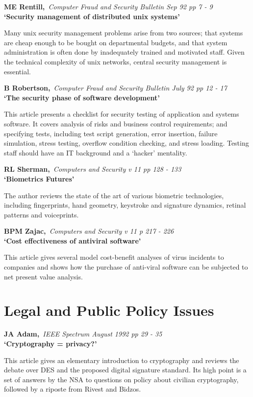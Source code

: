 {\bf \noindent ME Rentill,}{\em ~Computer Fraud and Security Bulletin Sep 92
pp 7 - 9\\}
{\bf `Security management of distributed unix systems'}

Many unix security management problems arise from two sources; that systems
are cheap enough to be bought on departmental budgets, and that system
administration is often done by inadequately trained and motivated staff.
Given the technical complexity of unix networks, central security management
is essential.

{\bf \noindent B Robertson,}{\em ~Computer Fraud and Security Bulletin July 
92 pp 12 - 17\\}
{\bf `The security phase of software development'}

This article presents a checklist for security testing of application and
systems software. It covers analysis of risks and business control 
requirements; and specifying tests, including test script generation, error
insertion, failure simulation, stress testing, overflow condition checking,
and stress loading. Testing staff should have an IT background and a
`hacker' mentality.

{\bf \noindent RL Sherman,}{\em ~Computers and Security v 11 pp 128 - 133\\}
{\bf `Biometrics Futures'}

The author reviews the state of the art of various biometric technologies,
including fingerprints, hand geometry, keystroke and signature dynamics, 
retinal patterns and voiceprints.

{\bf \noindent BPM Zajac,}{\em ~Computers and Security v 11 p 217 -  226\\}
{\bf `Cost effectiveness of antiviral software'}

This article gives several model cost-benefit analyses of virus incidents to 
companies and shows how the purchase of anti-viral software can be subjected 
to net present value analysis.



\pagebreak
\normalsize
\section{Legal and Public Policy Issues}
\small

{\bf \noindent JA Adam,}{\em ~IEEE Spectrum August 1992 pp 29 - 35\\}
{\bf `Cryptography = privacy?'}

This article gives an elementary introduction to cryptography and reviews
the debate over DES and the proposed digital signature standard. Its high
point is a set of answers by the NSA to questions on policy about civilian
cryptography, followed by a riposte from Rivest and Bidzos.

